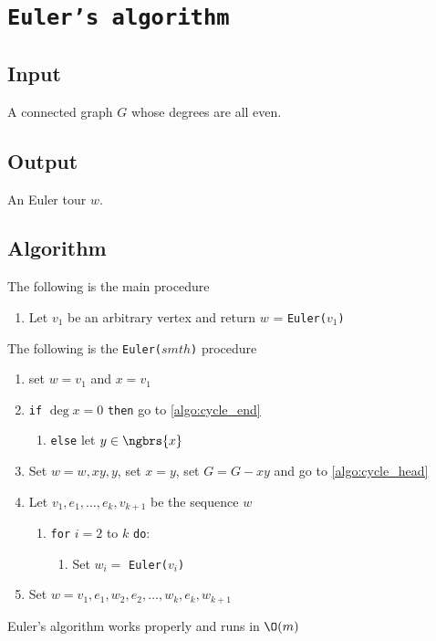 \section{\texttt{Euler's algorithm}}
\subsection{Input}
    A connected graph $G$ whose degrees are all even.
\subsection{Output}
    An Euler tour $w$.
\subsection{Algorithm}
The following is the main procedure
\begin{enumerate}
    \item Let $v_1$ be an arbitrary vertex and return $w$ = \texttt{Euler($v_1$)}
\end{enumerate}
The following is the \texttt{Euler($smth$)} procedure
\begin{enumerate}
    \item set $w = v_1$ and $x = v_1$
    \item \label{algo:cycle_head} \texttt{if} $\deg{x} = 0$ \texttt{then} go to \ref{algo:cycle_end}
    \begin{enumerate}
        \item \texttt{else} let $y \in \ngbrs{x}$
    \end{enumerate}
    \item Set $w = w, xy, y$, set $x = y$, set $G = G - xy$ and go to \ref{algo:cycle_head}
    \item \label{algo:cycle_end} Let $v_1, e_1, \dots, e_k, v_{k + 1}$ be the sequence $w$
    \begin{enumerate}
        \item \texttt{for} $i = 2$ to $k$ \texttt{do}:
        \begin{enumerate}
            \item Set $w_i =$ \texttt{Euler($v_i$)}
        \end{enumerate}
    \end{enumerate}
    \item Set $w = v_1, e_1, w_2, e_2, \dots, w_k, e_k, w_{k + 1}$
\end{enumerate}
\begin{customtheorem}{1.29}
\label{theorem:1.29}
    Euler's algorithm works properly and runs in $\O(m)$
\end{customtheorem}
